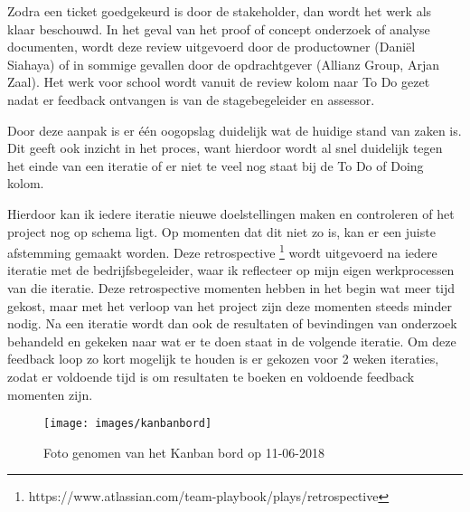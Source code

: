 Zodra een ticket goedgekeurd is door de stakeholder, dan wordt het werk als klaar beschouwd. In het geval van het proof of concept onderzoek of analyse documenten, wordt deze review uitgevoerd door de productowner (Daniël Siahaya) of in sommige gevallen door de opdrachtgever (Allianz Group, Arjan Zaal). Het werk voor school wordt vanuit de review kolom naar To Do gezet nadat er feedback ontvangen is van de stagebegeleider en assessor.\par
Door deze aanpak is er één oogopslag duidelijk wat de huidige stand van zaken is. Dit geeft ook inzicht in het proces, want hierdoor wordt al snel duidelijk tegen het einde van een iteratie of er niet te veel nog staat bij de To Do of Doing kolom.\par
Hierdoor kan ik iedere iteratie nieuwe doelstellingen maken en controleren of het project nog op schema ligt. Op momenten dat dit niet zo is, kan er een juiste afstemming gemaakt worden. Deze retrospective \footnote{ https://www.atlassian.com/team-playbook/plays/retrospective} wordt uitgevoerd na iedere iteratie met de bedrijfsbegeleider, waar ik reflecteer op mijn eigen werkprocessen van die iteratie. Deze retrospective momenten hebben in het begin wat meer tijd gekost, maar met het verloop van het project zijn deze momenten steeds minder nodig. Na een iteratie wordt dan ook de resultaten of bevindingen van onderzoek behandeld en gekeken naar wat er te doen staat in de volgende iteratie. Om deze feedback loop zo kort mogelijk te houden is er gekozen voor 2 weken iteraties, zodat er voldoende tijd is om resultaten te boeken en voldoende feedback momenten zijn.
\begin{figure}[h]
    \begin{center}
        \texttt{[image: images/kanbanbord]}
        \caption{Foto genomen van het Kanban bord op 11-06-2018}
        \label{fig:kanbanbord}
    \end{center}
\end{figure}
\newpage

